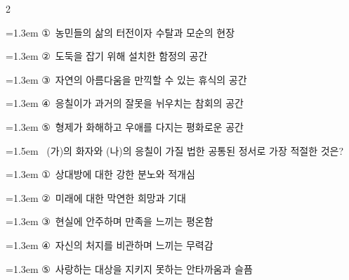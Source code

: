 \documentclass[10pt, a4paper]{article}
\begin{document}
\begin{multicols}{2}
\begin{minipage}{\columnwidth}
\vspace{0.5mm}
{\hangindent=1.3em  \noindent\hspace{0.3em}①~농민들의 삶의 터전이자 수탈과 모순의 현장\par}
{\hangindent=1.3em  \noindent\hspace{0.3em}②~도둑을 잡기 위해 설치한 함정의 공간\par}
{\hangindent=1.3em  \noindent\hspace{0.3em}③~자연의 아름다움을 만끽할 수 있는 휴식의 공간\par}
{\hangindent=1.3em  \noindent\hspace{0.3em}④~응칠이가 과거의 잘못을 뉘우치는 참회의 공간\par}
{\hangindent=1.3em  \noindent\hspace{0.3em}⑤~형제가 화해하고 우애를 다지는 평화로운 공간\par}
\vspace{4mm}
\end{minipage}
\par

\noindent\begin{minipage}{\columnwidth}
\vspace{2mm}
{\hangindent=1.5em  ~(가)의 화자와 (나)의 응칠이 가질 법한 공통된 정서로 가장 적절한 것은?\par}

\vspace{0.5mm}
{\hangindent=1.3em  \noindent\hspace{0.3em}①~상대방에 대한 강한 분노와 적개심\par}
{\hangindent=1.3em  \noindent\hspace{0.3em}②~미래에 대한 막연한 희망과 기대\par}
{\hangindent=1.3em  \noindent\hspace{0.3em}③~현실에 안주하며 만족을 느끼는 평온함\par}
{\hangindent=1.3em  \noindent\hspace{0.3em}④~자신의 처지를 비관하며 느끼는 무력감\par}
{\hangindent=1.3em  \noindent\hspace{0.3em}⑤~사랑하는 대상을 지키지 못하는 안타까움과 슬픔\par}
\vspace{4mm}
\end{minipage}
\par


\end{multicols}
\end{document}
